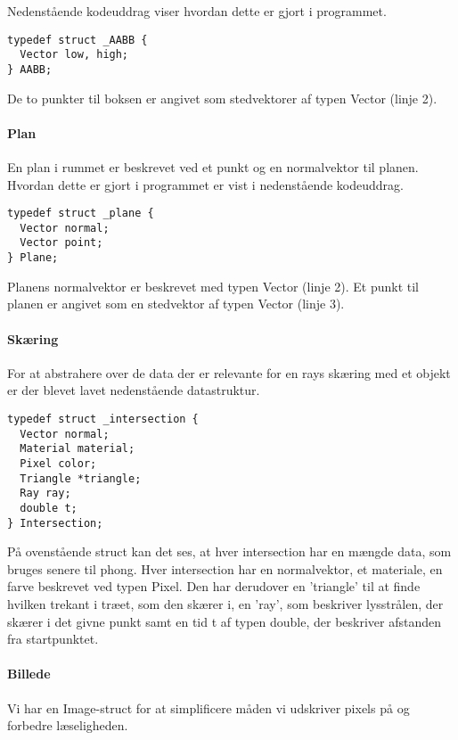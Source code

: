 Nedenstående kodeuddrag viser hvordan dette er gjort i programmet.

\begin{lstlisting}[style=Cstyle, caption=Struct til bounding boxes]
typedef struct _AABB {
  Vector low, high;
} AABB;
\end{lstlisting}

De to punkter til boksen er angivet som stedvektorer af typen Vector (linje 2).

\paragraph{Plan}
En plan i rummet er beskrevet ved et punkt og en normalvektor til planen. Hvordan dette er gjort i programmet er vist i nedenstående kodeuddrag. 

\begin{lstlisting}[style=Cstyle, caption=Struct til plan]
typedef struct _plane {
  Vector normal;
  Vector point;
} Plane;
\end{lstlisting}

Planens normalvektor er beskrevet med typen Vector (linje 2). Et punkt til planen er angivet som en stedvektor af typen Vector (linje 3).

\paragraph{Skæring}
For at abstrahere over de data der er relevante for en rays skæring med et objekt er der blevet lavet nedenstående datastruktur.

\begin{lstlisting}[style=Cstyle, caption=Struct til intersection]
typedef struct _intersection {
  Vector normal;
  Material material;
  Pixel color;
  Triangle *triangle;
  Ray ray;
  double t;
} Intersection;
\end{lstlisting}

På ovenstående struct kan det ses, at hver intersection har en mængde data, som bruges senere til phong. Hver intersection har en normalvektor, et materiale, en farve beskrevet ved typen Pixel. Den har derudover en 'triangle' til at finde hvilken trekant i træet, som den skærer i, en 'ray', som beskriver lysstrålen, der skærer i det givne punkt samt en tid t af typen double, der beskriver afstanden fra startpunktet.

\paragraph{Billede}
Vi har en Image-struct for at simplificere måden vi udskriver pixels på og forbedre læseligheden.

